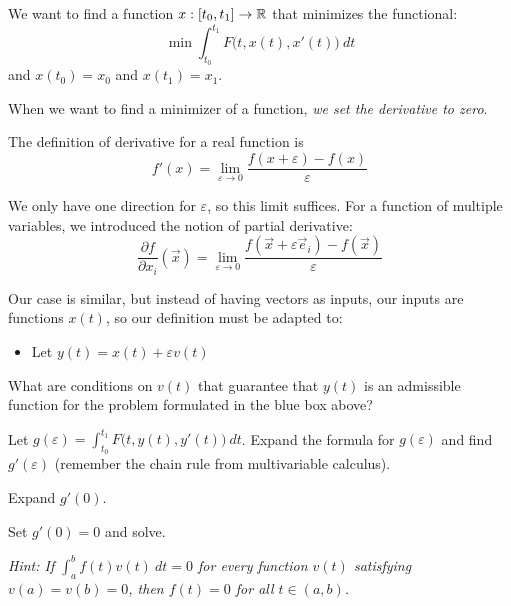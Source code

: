 

\begin{slide}
\question

\begin{problem}

We want to find a function $x: [t_0,t_1] \to \mathbb{R}$ that minimizes the functional:
\[ \min \int_{t_0}^{t_1} F \big(t, x(t), x'(t) \big) ~dt \]
and $x(t_0)=x_0$ and $x(t_1)=x_1$.
\end{problem}

When we want to find a minimizer of a function, \textsl{we set the derivative to zero}.



\begin{parts}
	\item The definition of derivative for a real function is
	\[ f'(x) = \lim_{\varepsilon \to 0} \frac{f(x+\varepsilon)-f(x)}{\varepsilon} \]
	
	We only have one direction for $\varepsilon$, so this limit suffices. For a function of multiple variables, we introduced the notion of partial derivative:
	\[ \frac{\partial f}{\partial x_i}(\vec{x}) = \lim_{\varepsilon \to 0} \frac{f(\vec{x}+\varepsilon \vec{e}_i)-f(\vec{x})}{\varepsilon} \]
	
	Our case is similar, but instead of having vectors as inputs, our inputs are functions $x(t)$, so our definition must be adapted to:
	\begin{itemize}
		\item Let $y(t) = x(t) + \varepsilon v(t)$
	\end{itemize}	
	
	What are conditions on $v(t)$ that guarantee that $y(t)$ is an admissible function for the problem formulated in the blue box above?
	
	\item Let $\displaystyle g(\varepsilon) = \int_{t_0}^{t_1} F\big( t, y(t), y'(t) \big) ~dt$. Expand the formula for $g(\varepsilon)$ and find $g'(\varepsilon)$ (remember the chain rule from multivariable calculus).

	\item Expand $g'(0)$.

	\item Set $g'(0)=0$ and solve.
	
	\textit{Hint: If $\int_a^b f(t) v(t) ~dt=0$ for every function $v(t)$ satisfying $v(a)=v(b)=0$, then $f(t)=0$ for all $t \in (a,b)$.}

\end{parts}
\end{slide}


